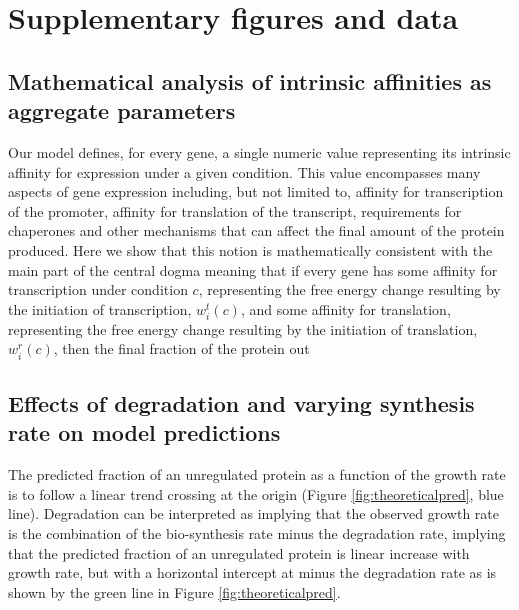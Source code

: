 \documentclass{article}
\newcommand{\beginsupplement}{%
        \setcounter{table}{0}
        \renewcommand{\thetable}{S\arabic{table}}%
        \setcounter{figure}{0}
        \renewcommand{\thefigure}{S\arabic{figure}}%
    }
\begin{document}

\section{Supplementary figures and data}
\beginsupplement
\subsection{Mathematical analysis of intrinsic affinities as aggregate parameters}
\label{intrinsicaffinitymath}
Our model defines, for every gene, a single numeric value representing its intrinsic affinity for expression under a given condition.
This value encompasses many aspects of gene expression including, but not limited to, affinity for transcription of the promoter, affinity for translation of the transcript, requirements for chaperones and other mechanisms that can affect the final amount of the protein produced.
Here we show that this notion is mathematically consistent with the main part of the central dogma meaning that if every gene has some affinity for transcription under condition $c$, representing the free energy change resulting by the initiation of transcription, $w^t_i(c)$, and some affinity for translation, representing the free energy change resulting by the initiation of translation, $w^r_i(c)$, then the final fraction of the protein out  
\subsection{Effects of degradation and varying synthesis rate on model predictions}
\label{theoreticalintercep}
The predicted fraction of an unregulated protein as a function of the growth rate is to follow a linear trend crossing at the origin (Figure \ref{fig:theoreticalpred}, blue line).
Degradation can be interpreted as implying that the observed growth rate is the combination of the bio-synthesis rate minus the degradation rate, implying that the predicted fraction of an unregulated protein is linear increase with growth rate, but with a horizontal intercept at minus the degradation rate as is shown by the green line in Figure \ref{fig:theoreticalpred}.
\end{document}
